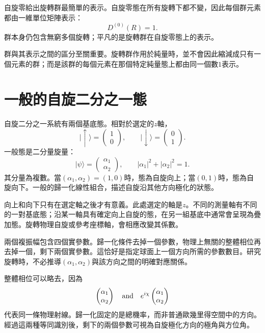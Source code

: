 自旋零給出旋轉群最簡單的表示。自旋零態在所有旋轉下都不變，因此每個群元素都由一維單位矩陣表示：
\begin{equation}
D^{(0)}(R)=1.
\end{equation}
群本身仍包含無窮多個旋轉；平凡的是旋轉群在自旋零態上的表示。

群與其表示之間的區分至關重要。旋轉群作用於純量時，並不會因此縮減成只有一個元素的群；而是該群的每個元素在那個特定純量態上都由同一個數\(1\)表示。

\section{一般的自旋二分之一態}

自旋二分之一系統有兩個基底態。相對於選定的\(z\)軸，
\begin{equation}
\lvert\uparrow\rangle=
\begin{pmatrix}1\\0\end{pmatrix},
\qquad
\lvert\downarrow\rangle=
\begin{pmatrix}0\\1\end{pmatrix}.
\end{equation}
一般態是二分量旋量：
\begin{equation}
\lvert\psi\rangle=
\begin{pmatrix}\alpha_1\\\alpha_2\end{pmatrix},
\qquad
|\alpha_1|^2+|\alpha_2|^2=1.
\label{eq:l3-spinor}
\end{equation}
其分量為複數。當\((\alpha_1,\alpha_2)=(1,0)\)時，態為自旋向上；當\((0,1)\)時，態為自旋向下。一般的歸一化線性組合，描述自旋沿其他方向極化的狀態。

{向上}和{向下}只有在選定軸之後才有意義。此處選定的軸是\(z\)。不同的測量軸有不同的一對基底態；沿某一軸具有確定向上自旋的態，在另一組基底中通常會呈現為疊加態。旋轉物理自旋或參考座標軸，會相應改變其係數。

兩個複振幅包含四個實參數。歸一化條件去掉一個參數，物理上無關的整體相位再去掉一個，剩下兩個實參數。這恰好是指定球面上一個方向所需的參數數目。研究旋轉時，不必推導\((\alpha_1,\alpha_2)\)與該方向之間的明確對應關係。

整體相位可以略去，因為
\begin{equation}
\begin{pmatrix}\alpha_1\\\alpha_2\end{pmatrix}
\quad\hbox{and}\quad
e^{i\chi}
\begin{pmatrix}\alpha_1\\\alpha_2\end{pmatrix}
\end{equation}
代表同一條物理射線。歸一化固定的是總機率，而非普通歐幾里得空間中的方向。經過這兩種等同識別後，剩下的兩個參數可視為自旋極化方向的極角與方位角。


